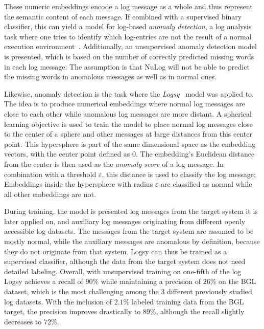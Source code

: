 These numeric embeddings encode a log message as a whole and thus represent the semantic content of each message.
If combined with a supervised binary classifier, this can yield a model for log-based \emph{anomaly detection},
a log analysis task where one tries to identify which log-entries are not the result of a normal execution environment~\parencite{nulog}.
Additionally, an unsupervised anomaly detection model is presented,
which is based on the number of correctly predicted missing words in each log message:
The assumption is that NuLog will not be able to predict the missing words in anomalous messages as well as in normal ones.

Likewise, anomaly detection is the task where the \emph{Logsy}~\parencite{logsy} model was applied to.
The idea is to produce numerical embeddings where normal log messages are close to each other
while anomalous log messages are more distant.
A spherical learning objective is used to train the model
to place normal log messages close to the center of a sphere
and other messages at large distances from this center point.
This hypersphere is part of the same dimensional space as the embedding vectors,
with the center point defined as 0.
The embedding's Euclidean distance from the center is then used as the \emph{anomaly score} of a log message.
In combination with a threshold \(\varepsilon\), this distance is used to classify the log message;
Embeddings inside the hypersphere with radius \(\varepsilon\) are classified as normal while all other embeddings are not.

During training, the model is presented log messages from the target system it is later applied on,
and auxiliary log messages originating from different openly accessible log datasets.
The messages from the target system are assumed to be mostly normal,
while the auxiliary messages are anomalous by definition, because they do not originate from that system.
Logsy can thus be trained as a supervised classifier, although the data from the target system does not need detailed labeling.
Overall, with unsupervised training on one-fifth of the log
Logsy achieves a recall of \(90\%\) while maintaining a precision of \(26\%\) on the BGL dataset,
which is the most challenging among the 3 different previously studied log datasets.
With the inclusion of \(2.1\%\) labeled training data from the BGL target, the precision improves drastically to \(89\%\),
although the recall slightly decreases to \(72\%\).

